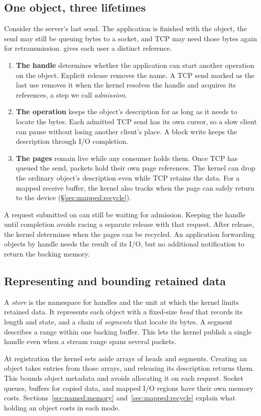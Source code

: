 \subsection{One object, three lifetimes}
\label{sec:lending:objects}
\label{sec:named:objects}

Consider the server's last send. The application is finished with the object,
the send may still be queuing bytes to a socket, and TCP may need those bytes
again for retransmission. \sys gives each user a distinct reference.

\begin{enumerate}
\setlength{\itemsep}{2pt}
\item \textbf{The handle} determines whether the application can start another
  operation on the object. Explicit release removes the name. A TCP send
  marked as the last use removes it when the kernel resolves the handle and
  acquires its references, a step we call \emph{admission}.
\item \textbf{The operation} keeps the object's description for as long as it
  needs to locate the bytes. Each admitted TCP send has its own cursor, so a
  slow client can pause without losing another client's place. A block write
  keeps the description through I/O completion.
\item \textbf{The pages} remain live while any consumer holds them. Once TCP
  has queued the send, packets hold their own page references. The kernel can
  drop the ordinary object's description even while TCP retains the data.
  For a mapped receive buffer, the kernel also tracks when the page can safely
  return to the device (\S\ref{sec:mapped:recycle}).
\end{enumerate}

A request submitted on \iouring can still be waiting for admission. Keeping the
handle until completion avoids racing a separate release with that request.
After release, the kernel determines when the pages can be recycled. An
application forwarding objects by handle needs the result of its I/O, but no
additional notification to return the backing memory.

\subsection{Representing and bounding retained data}
\label{sec:lending:cost}

A \emph{store} is the namespace for handles and the unit at which the kernel
limits retained data. It represents each object with a fixed-size \emph{head}
that records its length and state, and a chain of \emph{segments} that locate
its bytes. A segment describes a range within one backing buffer. This lets
the kernel publish a single handle even when a stream range spans several
packets.

At registration the kernel sets aside arrays of heads and segments. Creating
an object takes entries from those arrays, and releasing its description
returns them. This bounds object metadata and avoids allocating it on each
request. Socket queues, buffers for copied data, and mapped I/O regions have
their own memory costs. Sections~\ref{sec:named:memory} and~\ref{sec:mapped:recycle}
explain what holding an object costs in each mode.
